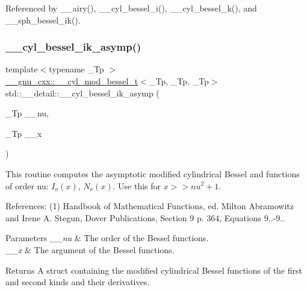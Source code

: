 Referenced by \+\_\+\+\_\+airy(), \+\_\+\+\_\+cyl\+\_\+bessel\+\_\+i(), \+\_\+\+\_\+cyl\+\_\+bessel\+\_\+k(), and \+\_\+\+\_\+sph\+\_\+bessel\+\_\+ik().

\mbox{\label{namespacestd_1_1____detail_a9f88b1d2b4158cc854a91a5ae7b4168d}} 
\subsubsection{\texorpdfstring{\+\_\+\+\_\+cyl\+\_\+bessel\+\_\+ik\+\_\+asymp()}{\_\_cyl\_bessel\_ik\_asymp()}}
{\footnotesize\ttfamily template$<$typename \+\_\+\+Tp $>$ \\
\hyperlink{struct____gnu__cxx_1_1____cyl__mod__bessel__t}{\+\_\+\+\_\+gnu\+\_\+cxx\+::\+\_\+\+\_\+cyl\+\_\+mod\+\_\+bessel\+\_\+t}$<$\+\_\+\+Tp, \+\_\+\+Tp, \+\_\+\+Tp$>$ std\+::\+\_\+\+\_\+detail\+::\+\_\+\+\_\+cyl\+\_\+bessel\+\_\+ik\+\_\+asymp (\begin{DoxyParamCaption}\item[{\+\_\+\+Tp}]{\+\_\+\+\_\+nu,  }\item[{\+\_\+\+Tp}]{\+\_\+\+\_\+x }\end{DoxyParamCaption})}



This routine computes the asymptotic modified cylindrical Bessel and functions of order nu\+: $ I_{\nu}(x) $, $ N_{\nu}(x) $. Use this for $ x >> nu^2 + 1 $. 

References\+: (1) Handbook of Mathematical Functions, ed. Milton Abramowitz and Irene A. Stegun, Dover Publications, Section 9 p. 364, Equations 9..-\/9..


\begin{DoxyParams}{Parameters}
{\em \+\_\+\+\_\+nu} & The order of the Bessel functions. \\
\hline
{\em \+\_\+\+\_\+x} & The argument of the Bessel functions. \\
\hline
\end{DoxyParams}
\begin{DoxyReturn}{Returns}
A struct containing the modified cylindrical Bessel functions of the first and second kinds and their derivatives. 
\end{DoxyReturn}


